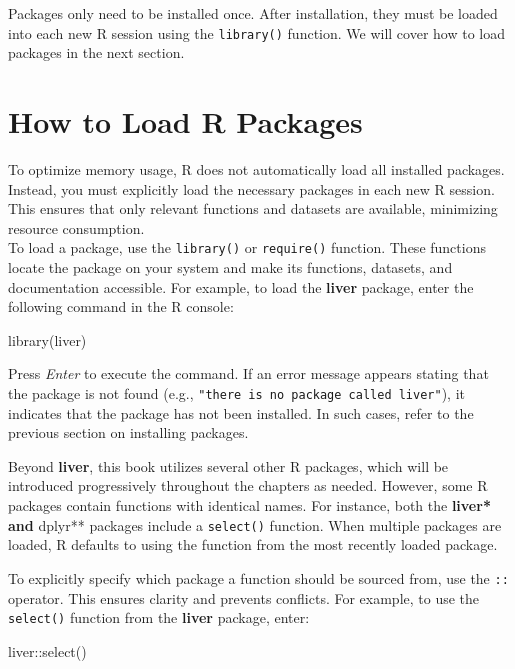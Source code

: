 \documentclass[
  11pt,
]{book}
\makeatletter
\newenvironment{Shaded}{}{}
\newcommand{\FunctionTok}[1]{#1}
\newcommand{\NormalTok}[1]{#1}
\newcommand{\SpecialCharTok}[1]{\textcolor[rgb]{0.39,0.39,0.39}{#1}}
\newenvironment{kframe}{%
\medskip{}
\setlength{\fboxsep}{.8em}
 \def\at@end@of@kframe{}%
 \ifinner\ifhmode%
  \def\at@end@of@kframe{\end{minipage}}%
  \begin{minipage}{\columnwidth}%
 \fi\fi%
 \def\FrameCommand##1{\hskip\@totalleftmargin \hskip-\fboxsep
 \colorbox{shadecolor}{##1}\hskip-\fboxsep
     \hskip-\linewidth \hskip-\@totalleftmargin \hskip\columnwidth}%
 \MakeFramed {\advance\hsize-\width
   \@totalleftmargin\z@ \linewidth\hsize
   \@setminipage}}%
 {\par\unskip\endMakeFramed%
 \at@end@of@kframe}
\renewenvironment{Shaded}{\begin{kframe}}{\end{kframe}}
\theoremstyle{definition}
\theoremstyle{definition}
\theoremstyle{definition}
\theoremstyle{definition}
\theoremstyle{remark}
\makeatother
\begin{document}
Packages only need to be installed once. After installation, they must be loaded into each new R session using the \texttt{library()} function. We will cover how to load packages in the next section.

\section{How to Load R Packages}\label{how-to-load-r-packages}

To optimize memory usage, R does not automatically load all installed packages. Instead, you must explicitly load the necessary packages in each new R session. This ensures that only relevant functions and datasets are available, minimizing resource consumption.\\
To load a package, use the \texttt{library()} or \texttt{require()} function. These functions locate the package on your system and make its functions, datasets, and documentation accessible. For example, to load the \textbf{liver} package, enter the following command in the R console:

\begin{Shaded}
\begin{Highlighting}[]
\FunctionTok{library}\NormalTok{(liver)}
\end{Highlighting}
\end{Shaded}

Press \emph{Enter} to execute the command. If an error message appears stating that the package is not found (e.g., \texttt{"there\ is\ no\ package\ called\ \textquotesingle{}liver\textquotesingle{}"}), it indicates that the package has not been installed. In such cases, refer to the previous section on installing packages.

Beyond \textbf{liver}, this book utilizes several other R packages, which will be introduced progressively throughout the chapters as needed. However, some R packages contain functions with identical names. For instance, both the \textbf{liver* and }dplyr** packages include a \texttt{select()} function. When multiple packages are loaded, R defaults to using the function from the most recently loaded package.

To explicitly specify which package a function should be sourced from, use the \texttt{::} operator. This ensures clarity and prevents conflicts. For example, to use the \texttt{select()} function from the \textbf{liver} package, enter:

\begin{Shaded}
\begin{Highlighting}[]
\NormalTok{liver}\SpecialCharTok{::}\FunctionTok{select}\NormalTok{()}
\end{Highlighting}
\end{Shaded}
\end{document}

